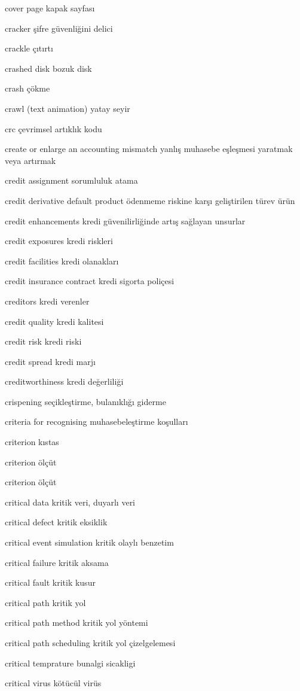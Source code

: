 \documentclass[12pt,fleqn]{article}\usepackage{../../common}
\begin{document}
cover page kapak sayfası

cracker şifre güvenliğini delici

crackle çıtırtı

crashed disk bozuk disk

crash çökme

crawl (text animation) yatay seyir

crc çevrimsel artıklık kodu

create or enlarge an accounting mismatch yanlış muhasebe eşleşmesi yaratmak veya artırmak

credit assignment sorumluluk atama

credit derivative default product ödenmeme riskine karşı geliştirilen türev ürün

credit enhancements kredi güvenilirliğinde artış sağlayan unsurlar

credit exposures kredi riskleri

credit facilities kredi olanakları

credit insurance contract kredi sigorta poliçesi

creditors kredi verenler

credit quality kredi kalitesi

credit risk kredi riski

credit spread kredi marjı

creditworthiness kredi değerliliği

crispening seçikleştirme, bulanıklığı giderme

criteria for recognising muhasebeleştirme koşulları

criterion kıstas

criterion ölçüt

criterion ölçüt

critical data kritik veri, duyarlı veri

critical defect kritik eksiklik

critical event simulation kritik olaylı benzetim

critical failure kritik aksama

critical fault kritik kusur

critical path kritik yol

critical path method kritik yol yöntemi

critical path scheduling kritik yol çizelgelemesi

critical temprature bunalgi sicakligi

critical virus kötücül virüs
\end{document}
